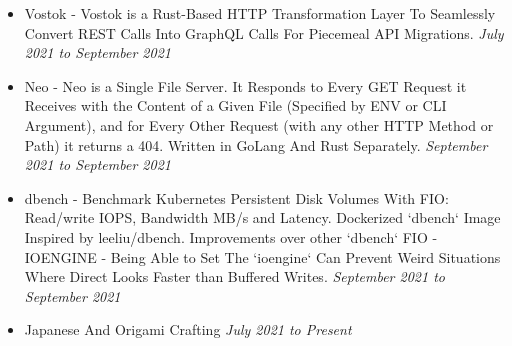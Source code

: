 \documentclass{myresume}
\begin{document}
\begin{itemize}
     	\item Vostok - Vostok is a Rust-Based HTTP Transformation Layer To Seamlessly Convert REST Calls Into GraphQL Calls For Piecemeal API Migrations. \textit {July 2021 to September 2021}
     	\item Neo - Neo is a Single File Server. It Responds to Every GET Request it Receives with the Content of a Given File (Specified by ENV or CLI Argument), and for Every Other Request (with any other HTTP Method or Path) it returns a 404. Written in GoLang And Rust Separately. \textit {September 2021 to September 2021}
     	\item dbench - Benchmark Kubernetes Persistent Disk Volumes With FIO: Read/write IOPS, Bandwidth MB/s and Latency. Dockerized `dbench` Image Inspired by leeliu/dbench. Improvements over other `dbench` FIO - IOENGINE - Being Able to Set The `ioengine` Can Prevent Weird Situations Where Direct Looks Faster than Buffered Writes. \textit{September 2021 to September 2021}    	
       \end{itemize}   
 
        \begin{itemize}
                \item Japanese And Origami Crafting \textit{July 2021 to Present}
        \end{itemize}
\end{document}
